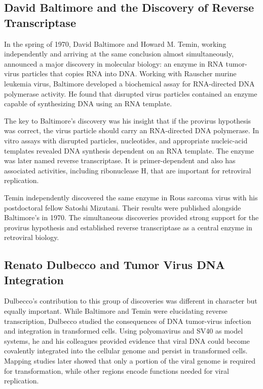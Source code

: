 \subsection{David Baltimore and the Discovery of Reverse Transcriptase}

In the spring of 1970, David Baltimore and Howard M. Temin, working independently and arriving at the same conclusion almost simultaneously, announced a major discovery in molecular biology: an enzyme in RNA tumor-virus particles that copies RNA into DNA. Working with Rauscher murine leukemia virus, Baltimore developed a biochemical assay for RNA-directed DNA polymerase activity. He found that disrupted virus particles contained an enzyme capable of synthesizing DNA using an RNA template.

The key to Baltimore's discovery was his insight that if the provirus hypothesis was correct, the virus particle should carry an RNA-directed DNA polymerase. In vitro assays with disrupted particles, nucleotides, and appropriate nucleic-acid templates revealed DNA synthesis dependent on an RNA template. The enzyme was later named reverse transcriptase. It is primer-dependent and also has associated activities, including ribonuclease H, that are important for retroviral replication.

Temin independently discovered the same enzyme in Rous sarcoma virus with his postdoctoral fellow Satoshi Mizutani. Their results were published alongside Baltimore's in 1970. The simultaneous discoveries provided strong support for the provirus hypothesis and established reverse transcriptase as a central enzyme in retroviral biology.

\subsection{Renato Dulbecco and Tumor Virus DNA Integration}

Dulbecco's contribution to this group of discoveries was different in character but equally important. While Baltimore and Temin were elucidating reverse transcription, Dulbecco studied the consequences of DNA tumor-virus infection and integration in transformed cells. Using polyomavirus and SV40 as model systems, he and his colleagues provided evidence that viral DNA could become covalently integrated into the cellular genome and persist in transformed cells. Mapping studies later showed that only a portion of the viral genome is required for transformation, while other regions encode functions needed for viral replication.

